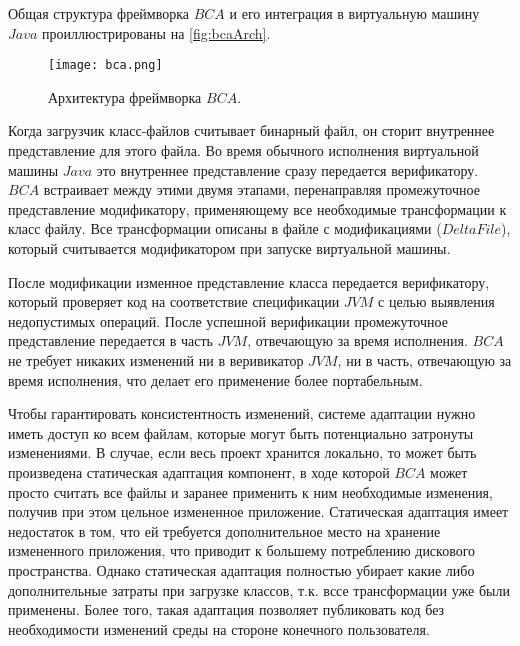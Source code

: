 Общая структура фреймворка $BCA$ и его интеграция в виртуальную машину $Java$ проиллюстрированы на \autoref{fig:bcaArch}.

\begin{figure}[h]
\centering
\texttt{[image: bca.png]}
\caption{Архитектура фреймворка $BCA$.}
\label{fig:bcaArch}
\end{figure}

Когда загрузчик класс-файлов считывает бинарный файл, он сторит внутреннее представление для этого файла. Во время обычного исполнения виртуальной машины $Java$ это внутреннее представление сразу передается верификатору. $BCA$ встраивает между этими двумя этапами, перенаправляя промежуточное представление модификатору, применяющему все необходимые трансформации к класс файлу. Все трансформации описаны в файле с модификациями ($Delta File$), который считывается модификатором при запуске виртуальной машины. 

После модификации изменное представление класса передается верификатору, который проверяет код на соответствие спецификации $JVM$ с целью выявления недопустимых операций. После успешной верификации промежуточное представление передается в часть $JVM$, отвечающую за время исполнения. $BCA$ не требует никаких изменений ни в веривикатор $JVM$, ни в часть, отвечающую за время исполнения, что делает его применение более портабельным.

Чтобы гарантировать консистентность изменений, системе адаптации нужно иметь доступ ко всем файлам, которые могут быть потенциально затронуты изменениями. В случае, если весь проект хранится локально, то может быть произведена статическая адаптация компонент, в ходе которой $BCA$ может просто считать все файлы и заранее применить к ним необходимые изменения, получив при этом цельное измененное приложение. Статическая адаптация имеет недостаток в том, что ей требуется дополнительное место на хранение измененного приложения, что приводит к большему потреблению дискового пространства. Однако статическая адаптация полностью убирает какие либо дополнительные затраты при загрузке классов, т.к. вссе трансформации уже были применены. Более того, такая адаптация позволяет публиковать код без необходимости изменений среды на стороне конечного пользователя.

